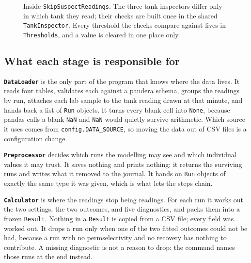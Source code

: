 \begin{figure}[htbp]
\caption{Inside \texttt{SkipSuspectReadings}. The three tank inspectors differ only in which
tank they read; their checks are built once in the shared \texttt{TankInspector}. Every
threshold the checks compare against lives in \texttt{Thresholds}, and a value is cleared in
one place only.}
\label{fig:inspectors}
\end{figure}

\subsection{What each stage is responsible for}

\textbf{\texttt{DataLoader}} is the only part of the program that knows where the data lives.
It reads four tables, validates each against a pandera schema, groups the readings by run,
attaches each lab sample to the tank reading drawn at that minute, and hands back a list of
\texttt{Run} objects. It turns every blank cell into \texttt{None}, because pandas calls a
blank \texttt{NaN} and \texttt{NaN} would quietly survive arithmetic. Which source it uses
comes from \texttt{config.DATA\_SOURCE}, so moving the data out of CSV files is a
configuration change.

\textbf{\texttt{Preprocessor}} decides which runs the modelling may see and which individual
values it may trust. It saves nothing and prints nothing: it returns the surviving runs and
writes what it removed to the journal. It hands on \texttt{Run} objects of exactly the same
type it was given, which is what lets the steps chain.

\textbf{\texttt{Calculator}} is where the readings stop being readings. For each run it
works out the two settings, the two outcomes, and five diagnostics, and packs them into a
frozen \texttt{Result}. Nothing in a \texttt{Result} is copied from a CSV file; every field
was worked out. It drops a run only when one of the two fitted outcomes could not be had,
because a run with no permselectivity and no recovery has nothing to contribute. A missing
diagnostic is not a reason to drop: the command names those runs at the end instead.

